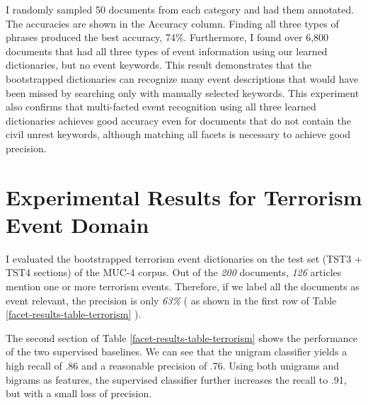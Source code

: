 I randomly sampled 50 documents from  each category 
and had them annotated.
The accuracies are shown in the Accuracy column. 
Finding all three types of phrases produced the best accuracy, 74\%. Furthermore, I
found over 6,800 documents that had all three types of event
information using our learned dictionaries, but no event keywords. 
This result demonstrates
that the bootstrapped dictionaries can recognize many event
descriptions that would have been missed by searching only with
manually selected keywords. This experiment also confirms that multi-facted event
recognition using all three learned dictionaries achieves good
accuracy even for documents that do not contain the civil unrest keywords, 
although matching all facets is necessary to achieve good precision. 


\section{Experimental Results for Terrorism Event Domain}

I evaluated the bootstrapped terrorism event dictionaries 
on the test set (TST3 + TST4 sections) of the MUC-4 corpus.
Out of the {\it 200} documents, {\it 126} articles mention 
one or more terrorism events. 
Therefore, if we label all the documents as 
event relevant, the precision is only {\it 63\%} (
as shown in the first row of Table \ref{facet-results-table-terrorism} ). 

The second section of Table \ref{facet-results-table-terrorism} 
shows the performance of the two supervised baselines. 
We can see that the unigram classifier 
yields a high recall of .86 and a reasonable precision of .76. 
Using both unigrams and bigrams as features, the supervised 
classifier further increases the recall to .91, but 
with a small loss of precision. 


